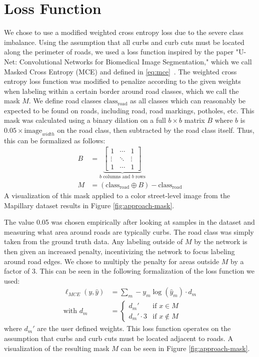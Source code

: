 \section{Loss Function}\label{section:approach-lossfunction}
We chose to use a modified weighted cross entropy loss due to the severe class imbalance.
Using the assumption that all curbs and curb cuts must be located along the perimeter of roads, we used a loss function inspired by the paper "U-Net: Convolutional Networks for Biomedical Image Segmentation," which we call Masked Cross Entropy (MCE) and defined in \eqref{eq:mce}~\cite{unet}.
The weighted cross entropy loss function was modified to penalize according to the given weights when labeling within a certain border around road classes, which we call the mask $M$.
We define road classes $\text{class}_{\text{road}}$ as all classes which can reasonably be expected to be found on roads, including road, road markings, potholes, etc.
This mask was calculated using a binary dilation on a full $b \times b$ matrix $B$ where $b$ is $0.05 \times \text{image}_{width}$ on the road class, then subtracted by the road class itself.
Thus, this can be formalized as follows:
\begin{align}
	B &= \underbrace{
			\begin{bmatrix}
				1  & \cdots & 1\\ 
				\vdots &  \ddots & \vdots\\ 
				1 &  \cdots & 1
				\end{bmatrix}}_{b \text{ columns and } b \text{ rows}} \\
	M &= \left(\text{class}_{\text{road}} \oplus B\right) - \text{class}_{\text{road}}
\end{align}
A visualization of this mask applied to a color street-level image from the Mapillary dataset results in Figure \ref{fig:approach-mask}.


The value 0.05 was chosen empirically after looking at samples in the dataset and measuring what area around roads are typically curbs.
The road class was simply taken from the ground truth data.
Any labeling outside of $M$ by the network is then given an increased penalty, incentivizing the network to focus labeling around road edges.
We chose to multiply the penalty for areas outside $M$ by a factor of 3.
This can be seen in the following formalization of the loss function we used:
\begin{align}\label{eq:mce}
	\ell_{MCE}(y, \hat{y}) &=\sum_{m}-y_m\log(\hat{y}_m) \cdot d_m\\
	\text{with } d_m &= 
	\begin{cases}
	d_m' & \text{if } x \in M\\
	d_m' \cdot 3 & \text{if } x \notin M
	\end{cases}
\end{align}
where $d_m'$ are the user defined weights. 
This loss function operates on the assumption that curbs and curb cuts must be located adjacent to roads.
A visualization of the resulting mask $M$ can be seen in Figure \ref{fig:approach-mask}.
